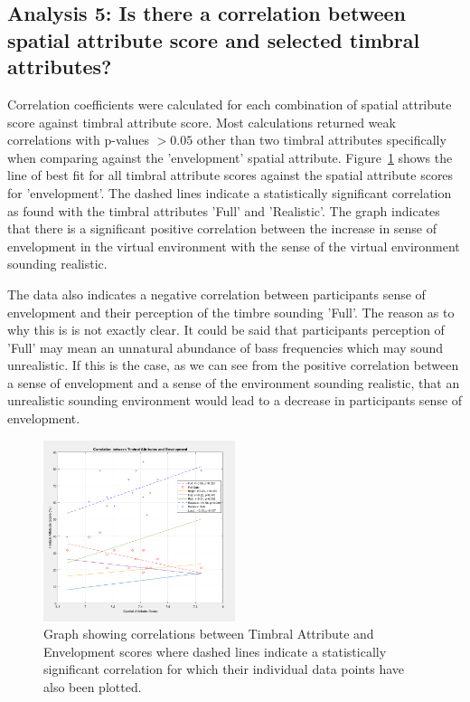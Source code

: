 















\subsection{Analysis 5: Is there a correlation between spatial attribute score and selected timbral attributes?}

	Correlation coefficients were calculated for each combination of spatial attribute score against timbral attribute score. Most calculations returned weak correlations with p-values $> 0.05$ other than two timbral attributes specifically when comparing against the 'envelopment' spatial attribute. Figure~\ref{image:corr_env} shows the line of best fit for all timbral attribute scores against the spatial attribute scores for 'envelopment'. The dashed lines indicate a statistically significant correlation as found with the timbral attributes 'Full' and 'Realistic'. The graph indicates that there is a significant positive correlation between the increase in sense of envelopment in the virtual environment with the sense of the virtual environment sounding realistic.

	The data also indicates a negative correlation between participants sense of envelopment and their perception of the timbre sounding 'Full'. The reason as to why this is is not exactly clear. It could be said that participants perception of 'Full' may mean an unnatural abundance of bass frequencies which may sound unrealistic. If this is the case, as we can see from the positive correlation between a sense of envelopment and a sense of the environment sounding realistic, that an unrealistic sounding environment would lead to a decrease in participants sense of envelopment. 

	\begin{figure}
		\includegraphics[width=0.5\textwidth]{images/plots/sa_ta_corr_env.PNG}
		\caption{Graph showing correlations between Timbral Attribute and Envelopment scores where dashed lines indicate a statistically significant correlation for which their individual data points have also been plotted.}
		\label{image:corr_env} 
	\end{figure}		
